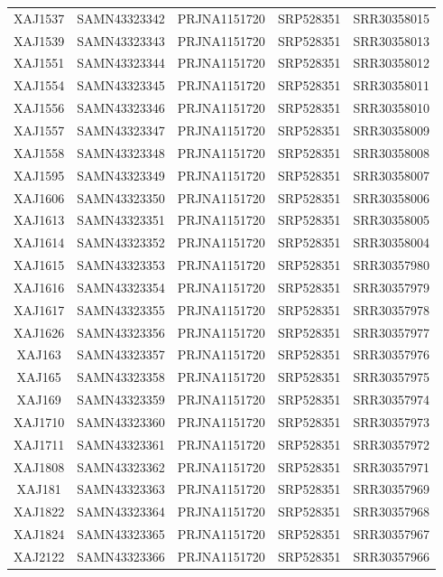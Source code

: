 \documentclass[
]{book}
\begin{document}
\begin{longtable}[]{@{}ccccc@{}}
XAJ1537 & SAMN43323342 & PRJNA1151720 & SRP528351 & SRR30358015 \\
XAJ1539 & SAMN43323343 & PRJNA1151720 & SRP528351 & SRR30358013 \\
XAJ1551 & SAMN43323344 & PRJNA1151720 & SRP528351 & SRR30358012 \\
XAJ1554 & SAMN43323345 & PRJNA1151720 & SRP528351 & SRR30358011 \\
XAJ1556 & SAMN43323346 & PRJNA1151720 & SRP528351 & SRR30358010 \\
XAJ1557 & SAMN43323347 & PRJNA1151720 & SRP528351 & SRR30358009 \\
XAJ1558 & SAMN43323348 & PRJNA1151720 & SRP528351 & SRR30358008 \\
XAJ1595 & SAMN43323349 & PRJNA1151720 & SRP528351 & SRR30358007 \\
XAJ1606 & SAMN43323350 & PRJNA1151720 & SRP528351 & SRR30358006 \\
XAJ1613 & SAMN43323351 & PRJNA1151720 & SRP528351 & SRR30358005 \\
XAJ1614 & SAMN43323352 & PRJNA1151720 & SRP528351 & SRR30358004 \\
XAJ1615 & SAMN43323353 & PRJNA1151720 & SRP528351 & SRR30357980 \\
XAJ1616 & SAMN43323354 & PRJNA1151720 & SRP528351 & SRR30357979 \\
XAJ1617 & SAMN43323355 & PRJNA1151720 & SRP528351 & SRR30357978 \\
XAJ1626 & SAMN43323356 & PRJNA1151720 & SRP528351 & SRR30357977 \\
XAJ163 & SAMN43323357 & PRJNA1151720 & SRP528351 & SRR30357976 \\
XAJ165 & SAMN43323358 & PRJNA1151720 & SRP528351 & SRR30357975 \\
XAJ169 & SAMN43323359 & PRJNA1151720 & SRP528351 & SRR30357974 \\
XAJ1710 & SAMN43323360 & PRJNA1151720 & SRP528351 & SRR30357973 \\
XAJ1711 & SAMN43323361 & PRJNA1151720 & SRP528351 & SRR30357972 \\
XAJ1808 & SAMN43323362 & PRJNA1151720 & SRP528351 & SRR30357971 \\
XAJ181 & SAMN43323363 & PRJNA1151720 & SRP528351 & SRR30357969 \\
XAJ1822 & SAMN43323364 & PRJNA1151720 & SRP528351 & SRR30357968 \\
XAJ1824 & SAMN43323365 & PRJNA1151720 & SRP528351 & SRR30357967 \\
XAJ2122 & SAMN43323366 & PRJNA1151720 & SRP528351 & SRR30357966 \\

\end{longtable}
\end{document}
